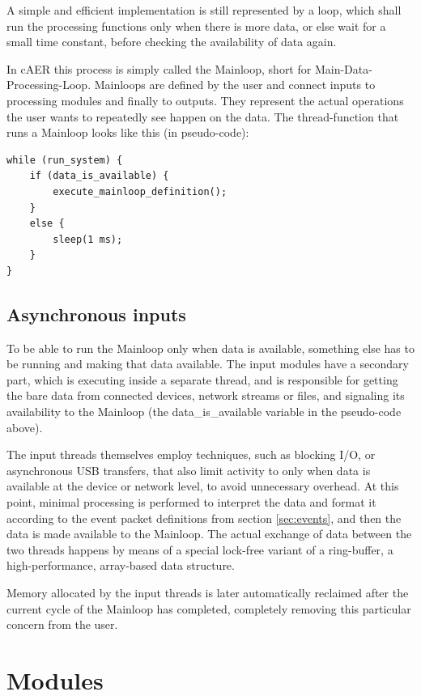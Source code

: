 \documentclass[a4paper,12pt]{report}
\begin{document}
A simple and efficient implementation is still represented by a loop, which shall run the processing functions only when there is more data, or else wait for a small time constant, before checking the availability of data again.

In cAER this process is simply called the Mainloop, short for Main-Data-Processing-Loop.
Mainloops are defined by the user and connect inputs to processing modules and finally to outputs.
They represent the actual operations the user wants to repeatedly see happen on the data.
\clearpage
The thread-function that runs a Mainloop looks like this (in pseudo-code):

\begin{lstlisting}
while (run_system) {
    if (data_is_available) {
        execute_mainloop_definition();
    }
    else {
        sleep(1 ms);
    }
}
\end{lstlisting}

\subsection{Asynchronous inputs} \label{sec:asynchronous_inputs}

To be able to run the Mainloop only when data is available, something else has to be running and making that data available. The input modules have a secondary part, which is executing inside a separate thread, and is responsible for getting the bare data from connected devices, network streams or files, and signaling its availability to the Mainloop (the data\_is\_available variable in the pseudo-code above).

The input threads themselves employ techniques, such as blocking I/O, or asynchronous USB transfers, that also limit activity to only when data is available at the device or network level, to avoid unnecessary overhead. At this point, minimal processing is performed to interpret the data and format it according to the event packet definitions from section \ref{sec:events}, and then the data is made available to the Mainloop.
The actual exchange of data between the two threads happens by means of a special lock-free variant of a ring-buffer, a high-performance, array-based data structure.

Memory allocated by the input threads is later automatically reclaimed after the current cycle of the Mainloop has completed, completely removing this particular concern from the user.

\section{Modules} \label{sec:modules}
\end{document}

